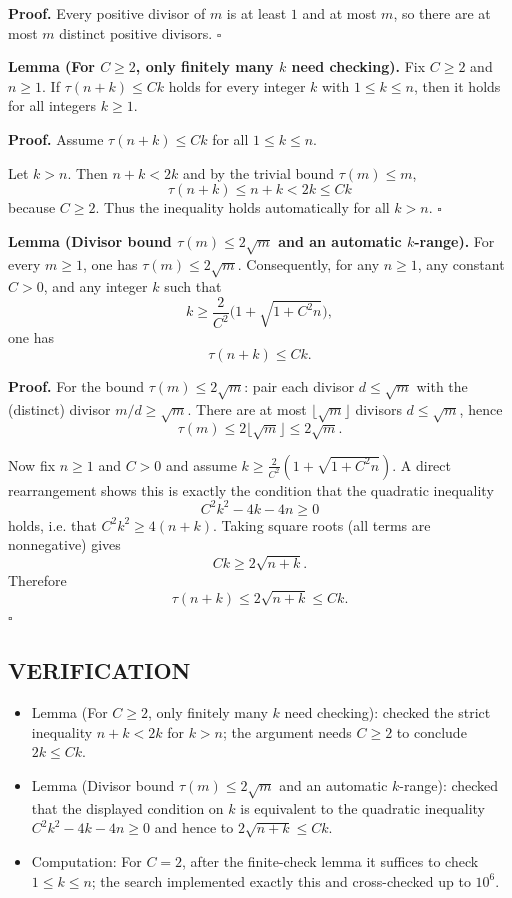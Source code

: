 \noindent\textbf{Proof.}
Every positive divisor of $m$ is at least $1$ and at most $m$, so there are at most $m$ distinct positive divisors.
\hfill$\square$


\noindent\textbf{Lemma (For $C\ge 2$, only finitely many $k$ need checking).}
Fix $C\ge 2$ and $n\ge 1$. If $\tau(n+k)\le Ck$ holds for every integer $k$ with $1\le k\le n$, then it holds for all integers $k\ge 1$.

\noindent\textbf{Proof.}
Assume $\tau(n+k)\le Ck$ for all $1\le k\le n$.

Let $k>n$. Then $n+k < 2k$ and by the trivial bound $\tau(m)\le m$,
\[
\tau(n+k)\le n+k < 2k \le Ck
\]
because $C\ge 2$. Thus the inequality holds automatically for all $k>n$.
\hfill$\square$


\noindent\textbf{Lemma (Divisor bound $\tau(m)\le 2\sqrt m$ and an automatic $k$-range).}
For every $m\ge 1$, one has $\tau(m)\le 2\sqrt m$. Consequently, for any $n\ge 1$, any constant $C>0$, and any integer $k$ such that
\[
k \ge \frac{2}{C^2}\bigl(1+\sqrt{1+C^2 n}\bigr),
\]
one has
\[
\tau(n+k)\le Ck.
\]

\noindent\textbf{Proof.}
For the bound $\tau(m)\le 2\sqrt m$: pair each divisor $d\le \sqrt m$ with the (distinct) divisor $m/d\ge \sqrt m$. There are at most $\lfloor \sqrt m\rfloor$ divisors $d\le \sqrt m$, hence
\[
\tau(m)\le 2\lfloor \sqrt m\rfloor \le 2\sqrt m.
\]

Now fix $n\ge 1$ and $C>0$ and assume $k\ge \frac{2}{C^2}(1+\sqrt{1+C^2 n})$. A direct rearrangement shows this is exactly the condition that the quadratic inequality
\[
C^2k^2-4k-4n\ge 0
\]
holds, i.e. that $C^2k^2\ge 4(n+k)$. Taking square roots (all terms are nonnegative) gives
\[
Ck\ge 2\sqrt{n+k}.
\]
Therefore
\[
\tau(n+k)\le 2\sqrt{n+k}\le Ck.
\]
\hfill$\square$


\subsection*{VERIFICATION}
\begin{itemize}
\item Lemma (For $C\ge 2$, only finitely many $k$ need checking): checked the strict inequality $n+k<2k$ for $k>n$; the argument needs $C\ge 2$ to conclude $2k\le Ck$.
\item Lemma (Divisor bound $\tau(m)\le 2\sqrt m$ and an automatic $k$-range): checked that the displayed condition on $k$ is equivalent to the quadratic inequality $C^2k^2-4k-4n\ge 0$ and hence to $2\sqrt{n+k}\le Ck$.
\item Computation: For $C=2$, after the finite-check lemma it suffices to check $1\le k\le n$; the search implemented exactly this and cross-checked up to $10^6$.
\end{itemize}

